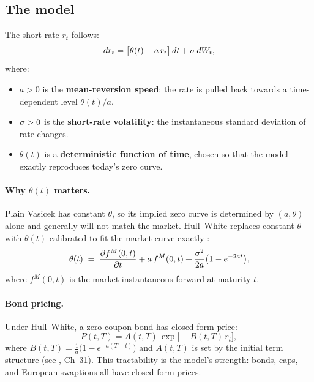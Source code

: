 \subsection{The model}

\begin{keyfactbox}
The short rate $r_t$ follows:
\begin{equation}
  dr_t = \bigl[\theta(t) - a\, r_t\bigr]\,dt + \sigma\, dW_t,
  \label{eq:hull_white}
\end{equation}
where:
\begin{itemize}
  \item $a > 0$ is the \textbf{mean-reversion speed}: the rate is
    pulled back towards a time-dependent level $\theta(t)/a$.
  \item $\sigma > 0$ is the \textbf{short-rate volatility}: the
    instantaneous standard deviation of rate changes.
  \item $\theta(t)$ is a \textbf{deterministic function of time},
    chosen so that the model exactly reproduces today's zero curve.
\end{itemize}
\end{keyfactbox}

\paragraph{Why $\theta(t)$ matters.}
Plain Vasicek has constant $\theta$, so its implied zero curve is
determined by $(a, \theta)$ alone and generally will not match the
market.  Hull--White replaces constant $\theta$ with $\theta(t)$
calibrated to fit the market curve exactly \citeHull:
\begin{equation}
  \theta(t) \;=\; \frac{\partial f^M(0,t)}{\partial t} + a\,f^M(0,t)
    + \frac{\sigma^2}{2a}\bigl(1 - e^{-2at}\bigr),
  \label{eq:hw_theta_calib}
\end{equation}
where $f^M(0,t)$ is the market instantaneous forward at maturity $t$.

\paragraph{Bond pricing.}
Under Hull--White, a zero-coupon bond has closed-form price:
\begin{equation}
  P(t,T) = A(t,T)\,\exp\!\bigl[-B(t,T)\,r_t\bigr],
  \label{eq:hw_bond}
\end{equation}
where $B(t,T) = \frac{1}{a}\bigl(1 - e^{-a(T-t)}\bigr)$ and $A(t,T)$
is set by the initial term structure (see \citeHull, Ch~31).  This
tractability is the model's strength: bonds, caps, and European
swaptions all have closed-form prices.

